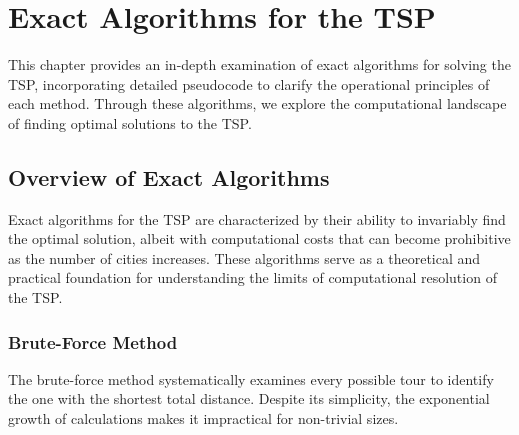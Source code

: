 
%

\makeatletter
\newcommand{\ntifpkgloaded}{%
	\@ifpackageloaded%
}
\makeatother

\chapter{Exact Algorithms for the \Gls{TSP}} \label{chapt:3}

This chapter provides an in-depth examination of exact algorithms for solving the \Gls{TSP}, incorporating detailed pseudocode to clarify the operational principles of each method. Through these algorithms, we explore the computational landscape of finding optimal solutions to the \Gls{TSP}.

\section{Overview of Exact Algorithms}

Exact algorithms for the \Gls{TSP} are characterized by their ability to invariably find the optimal solution, albeit with computational costs that can become prohibitive as the number of cities increases. These algorithms serve as a theoretical and practical foundation for understanding the limits of computational resolution of the \Gls{TSP}.

\subsection{Brute-Force Method}

The brute-force method systematically examines every possible tour to identify the one with the shortest total distance. Despite its simplicity, the exponential growth of calculations makes it impractical for non-trivial sizes.

